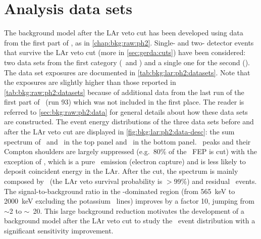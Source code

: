 \section{Analysis data sets}%
\label{sec:bkg:lar:ph2:data}

\begin{table}
  \centering
  \caption{%
    Properties of the data sets considered in this analysis. Further details about the
    \gerda\ detectors can be found in past publications~\cite{Agostini2013a,
    Agostini2018a}. Note that the exposures are slightly higher than those reported in
    \cref{tab:bkg:raw:ph2:datasets} because of additional data from the last run of the
    first part of \phasetwo\ (run~93) which was not included in the first place.
  }\label{tab:bkg:lar:ph2:datasets}
  \small
  
\end{table}%

The background model after the LAr veto cut has been developed using data from the first
part of \gerdatwo, as in \cref{chap:bkg:raw:ph2}. Single- and two- detector events that
survive the LAr veto cut (more in \cref{sec:gerda:cuts}) have been considered: two data
sets from the first category (\enrBEGeII\ and \enrCoaxII) and a single one for the second
(\enrGeII). The data set exposures are documented in \cref{tab:bkg:lar:ph2:datasets}.
Note that the exposures are slightly higher than those reported in
\cref{tab:bkg:raw:ph2:datasets} because of additional data from the last run of the first
part of \phasetwo\ (run 93) which was not included in the first place.  The reader is
referred to \cref{sec:bkg:raw:ph2:data} for general details about how these data sets are
constructed.
\newpar
The event energy distributions of the three data sets before and after the LAr veto cut
are displayed in \cref{fig:bkg:lar:ph2:data-desc}: the sum spectrum of \enrBEGeII\ and
\enrCoaxII\ in the top panel and \enrGeII\ in the bottom panel. \g\ peaks and their
Compton shoulders are largely suppressed (e.g.~80\% of the \kvz\ FEP is cut) with the
exception of \kvn, which is a pure \g\ emission (electron capture) and is less likely to
deposit coincident energy in the LAr. After the cut, the spectrum is mainly composed by
\nnbb\ (the LAr veto survival probability is $>99$\%) and residual \a\ events. The
signal-to-background ratio in the \nnbb-dominated region (from 565~keV to 2000~keV
excluding the potassium \g\ lines) improves by a factor 10, jumping from $\sim$2 to
$\sim$~20. This large background reduction motivates the development of a background model
after the LAr veto cut to study the \nnbb\ event distribution with a significant
sensitivity improvement.

